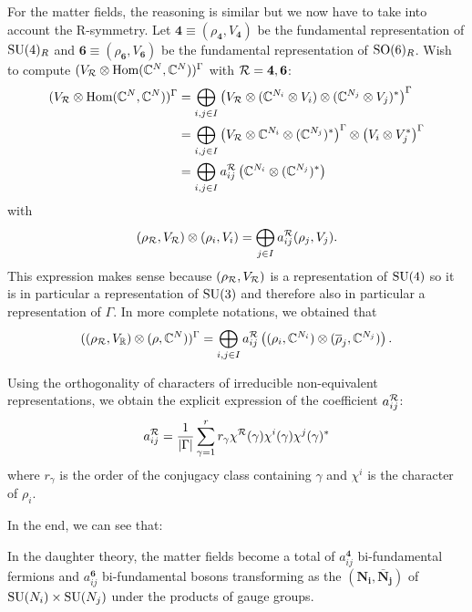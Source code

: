         For the matter fields, the reasoning is similar but we now have to take into account the R-symmetry. Let $\boldsymbol{4}\equiv(\rho_{\boldsymbol{4}},V_{\boldsymbol{4}})$ be the fundamental representation of $\text{SU}(4)_R$ and $\boldsymbol{6}\equiv(\rho_{\boldsymbol{6}},V_{\boldsymbol{6}})$ be the fundamental representation of $\text{SO}(6)_R$. Wish to compute $(V_{\mathcal{R}}\otimes\text{Hom}(\mathbb{C}^N,\mathbb{C}^N))^\Gamma$ with $\mathcal{R}=\boldsymbol{4},\boldsymbol{6}$:
        \begin{align}
            (V_{\mathcal{R}}\otimes\text{Hom}(\mathbb{C}^N,\mathbb{C}^N))^\Gamma &= \bigoplus_{i,j\in I} \left(V_{\mathcal{R}}\otimes (\mathbb{C}^{N_i}\otimes V_i)\otimes(\mathbb{C}^{N_j}\otimes V_j)^*\right)^\Gamma\\
            &= \bigoplus_{i,j\in I} \left(V_{\mathcal{R}}\otimes\mathbb{C}^{N_i}\otimes(\mathbb{C}^{N_j})^*\right)^\Gamma\otimes\left(V_i\otimes V^*_j\right)^\Gamma\\
            &= \bigoplus_{i,j\in I}a^{\mathcal{R}}_{ij}\left(\mathbb{C}^{N_i}\otimes(\mathbb{C}^{N_j})^*\right)
        \end{align}
        with
        \begin{equation}
            (\rho_{\mathcal{R}},V_{\mathcal{R}})\otimes(\rho_i,V_i)=\bigoplus_{j\in I}a^{\mathcal{R}}_{ij}(\rho_j,V_j).\label{eq:defaij}
        \end{equation}
        This expression makes sense because $(\rho_{\mathcal{R}},V_{\mathcal{R}})$ is a representation of $\text{SU}(4)$ so it is in particular a representation of $\text{SU}(3)$ and therefore also in particular a representation of $\Gamma$. In more complete notations, we obtained that
        \begin{equation}
            ((\rho_{\mathcal{R}},V_{\mathbb{R}})\otimes(\rho,\mathbb{C}^N))^\Gamma = \bigoplus_{i,j\in I}a^{\mathcal{R}}_{ij}\left((\rho_i,\mathbb{C}^{N_i})\otimes(\overline{\rho}_j,\mathbb{C}^{N_j})\right).\label{eq:resdecomp}
        \end{equation}
        

        Using the orthogonality of characters of irreducible non-equivalent representations, we obtain the explicit expression of the coefficient $a^{\mathcal{R}}_{ij}$:
        \begin{equation}
            a^{\mathcal{R}}_{ij} = \frac{1}{\abs{\Gamma}}\sum^r_{\gamma=1} r_\gamma\chi^{\mathcal{R}}(\gamma)\chi^i(\gamma)\chi^j(\gamma)^*
        \end{equation}
        where $r_\gamma$ is the order of the conjugacy class containing $\gamma$ and $\chi^i$ is the character of $\rho_i$.

        In the end, we can see that:
        \begin{result}
            In the daughter theory, the matter fields become a total of $a^{\boldsymbol{4}}_{ij}$ bi-fundamental fermions and $a^{\boldsymbol{6}}_{ij}$ bi-fundamental bosons transforming as the $(\boldsymbol{\textbf{N}_i},\boldsymbol{\bar{\textbf{N}}_j})$ of $\text{SU}(N_i)\times\text{SU}(N_j)$ under the products of gauge groups.
        \end{result}

